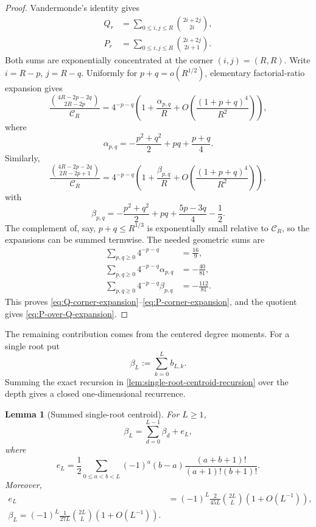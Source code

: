 \documentclass[11pt]{article}
\newtheorem{lemma}[theorem]{Lemma}
\theoremstyle{definition}
\theoremstyle{remark}
\begin{document}
\begin{proof}
Vandermonde's identity gives
\begin{align*}
 Q_r
 &=\sum_{0\le i,j\le R}
 \binom{2i+2j}{2i},\\
 P_r
 &=\sum_{0\le i,j\le R}
 \binom{2i+2j}{2i+1}.
\end{align*}
Both sums are exponentially concentrated at the corner \((i,j)=(R,R)\).
Write \(i=R-p\), \(j=R-q\).  Uniformly for
\(p+q=o(R^{1/2})\), elementary factorial-ratio expansion gives
\begin{equation}
 \frac{\binom{4R-2p-2q}{2R-2p}}{\mathscr C_R}
 =4^{-p-q}
 \left(1+\frac{\alpha_{p,q}}{R}
 +O\!\left(\frac{(1+p+q)^4}{R^2}\right)\right),
 \label{eq:Q-corner-local}
\end{equation}
where
\[
 \alpha_{p,q}
 =-\frac{p^2+q^2}{2}+pq+\frac{p+q}{4}.
\]
Similarly,
\begin{equation}
 \frac{\binom{4R-2p-2q}{2R-2p+1}}{\mathscr C_R}
 =4^{-p-q}
 \left(1+\frac{\beta_{p,q}}{R}
 +O\!\left(\frac{(1+p+q)^4}{R^2}\right)\right),
 \label{eq:P-corner-local}
\end{equation}
with
\[
 \beta_{p,q}
 =-\frac{p^2+q^2}{2}+pq+\frac{5p-3q}{4}-\frac12.
\]
The complement of, say, \(p+q\le R^{1/3}\) is exponentially small relative
to \(\mathscr C_R\), so the expansions can be summed termwise.  The needed
geometric sums are
\begin{align*}
 \sum_{p,q\ge0}4^{-p-q}&=\frac{16}{9},\\
 \sum_{p,q\ge0}4^{-p-q}\alpha_{p,q}&=-\frac{40}{81},\\
 \sum_{p,q\ge0}4^{-p-q}\beta_{p,q}&=-\frac{112}{81}.
\end{align*}
This proves \eqref{eq:Q-corner-expansion}--\eqref{eq:P-corner-expansion}, and
the quotient gives \eqref{eq:P-over-Q-expansion}.
\end{proof}

The remaining contribution comes from the centered degree moments.  For a
single root put
\begin{equation}
 \beta_L:=\sum_{k=0}^{L}b_{L,k}.
 \label{eq:beta-single-total}
\end{equation}
Summing the exact recursion in
\cref{lem:single-root-centroid-recursion} over the depth gives a closed
one-dimensional recurrence.

\begin{lemma}[Summed single-root centroid]
\label{lem:summed-single-root-centroid}
For \(L\ge1\),
\begin{equation}
 \beta_L=\sum_{d=0}^{L-1}\beta_d+e_L,
 \label{eq:beta-summed-recurrence}
\end{equation}
where
\begin{equation}
 e_L
 =\frac12\sum_{0\le a<b<L}
 (-1)^a(b-a)
 \frac{(a+b+1)!}{(a+1)!(b+1)!}.
 \label{eq:eL-exact}
\end{equation}
Moreover,
\begin{align}
 e_L
 &=(-1)^L\frac{2}{45L}\binom{2L}{L}
 \left(1+O(L^{-1})\right),
 \label{eq:eL-asymptotic}\\
 {
 \beta_L
 =(-1)^L\frac{1}{27L}\binom{2L}{L}
 \left(1+O(L^{-1})\right).}
 \label{eq:betaL-asymptotic}
\end{align}
\end{lemma}
\end{document}

